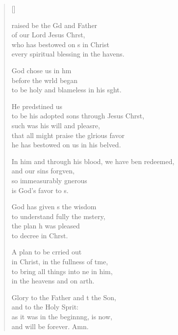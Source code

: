 \settowidth{\versewidth}{In him and through his blood, we have been redeemed, *}
\begin{verse}[\versewidth]
  \begin{patverse}
    raised be the Gd and Father\Med\\
    of our Lord Jesus Chr\pointup{\i}st,\\
    who has bestowed on s in Christ\Med\\
    every spiritual blessing in the havens.
    
    God chose us in h\pointup{\i}m\Flex\\
    before the wrld began\Med\\
    to be holy and blameless in his s\pointup{\i}ght.
    
    He predstined us\Med\\
    to be his adopted sons through Jesus Chr\pointup{\i}st,\Med\\
    such was his will and pleasre,\Flex\\
    that all might praise the glrious favor\Med\\
    he has bestowed on us in his belved.
    
    In him and through his blood, we have ben redeemed,\Med\\
    and our sins forg\pointup{\i}ven,\\
    so immeasurably gnerous\Med\\
    is God’s favor to s.
    
    God has given s the wisdom\Med\\
    to understand fully the mstery,\\
    the plan h was pleased\Med\\
    to decree in Chr\pointup{\i}st.
    
    A plan to be crried out\Med\\
    in Christ, in the fullness of t\pointup{\i}me,\\
    to bring all things into ne in him,\Med\\
    in the heavens and on arth.
    
    Glory to the Father and t the Son,\Med\\
    and to the Holy Sp\pointup{\i}rit:\\
    as it was in the beginn\pointup{\i}ng, is now,\Med\\
    and will be forever. Amn.
  \end{patverse}
\end{verse}
